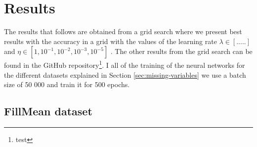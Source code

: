 \documentclass[../../main/main.tex]{subfiles}
\begin{document}
\newcommand{\FillMean}{../../plots/pdf/FillMean6/0.915_0.607_500_1000_1.0_0.0001}
\newcommand{\FillZero}{../../plots/pdf/FillZero6/0.913_0.647_500_1000_1.0_1e-06}
\newcommand{\FillPhiRandom}{../../plots/pdf/FillPhiRandom6/0.915_0.607_500_1000_1.0_0.0001}
\newcommand{\RemoveJets}{../../plots/pdf/RemoveJets6/0.908_0.526_500_1000_1.0_1e-05}
\newcommand{\RemovePhi}{../../plots/pdf/RemovePhi6/0.915_0.567_500_1000_1.0_0.0001}
\newcommand{\JetsNone}{../../plots/pdf/Jets06/0.902_0.405_500_1000_1.0_1e-05}
\newcommand{\JetsOne}{../../plots/pdf/Jets16/0.895_0.647_500_1000_1.0_0.0001}
\newcommand{\JetsTwo}{../../plots/pdf/Jets26/0.932_0.97_500_1000_1.0_1e-05}

\newcommand{\captionAcc}{Train (blue) and test (orange) accuracy.}
\newcommand{\captionLoss}{Train (blue) and test (orange) loss.}
\newcommand{\captionROC}{ROC curve of the neural network output.}
\newcommand{\captionDataset}[1]{The accuracy (a), loss (b) and the ROC curve (c) of the neural network output from the \emph{#1} dataset with \(\lambda=1\) and \(\eta=0.0001\).}
\newcommand{\captionBkgSig}{dd}
\newcommand{\captionLik}{dd}
\newcommand{\captionDatasetZ}[1]{#1}

\section{Results}
\label{sec:results}

The results that follows are obtained from a grid search where we present best results with the accuracy in a grid with the values of the learning rate \(\lambda\in[.....]\) and \(\eta\in [1,10^{-1},10^{-2},10^{-3},10^{-5}]\) . The other results from the grid search can be found in the GitHub repository\footnote{test}. I all of the training of the neural networks for the different datasets explained in Section \ref{sec:missing-variables} we use a batch size of 50 000 and train it for 500 epochs.


\subsection{FillMean dataset}
\label{sec:fillmean-dataset}
\end{document}
